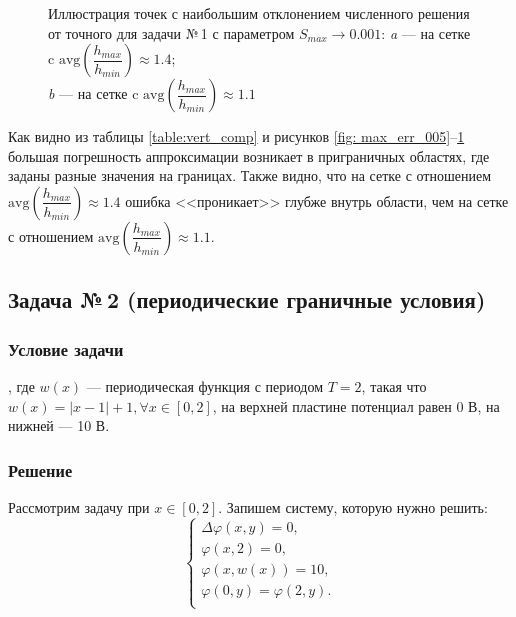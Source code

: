 \documentclass[12pt, a4paper]{article}
\renewcommand{\phi}{\varphi}
\begin{document}
\begin{figure}[!h]
\begin{center}
				\end{center} 
				\vspace*{-0.0mm} 
				\caption{Иллюстрация точек с наибольшим отклонением численного решения от точного для задачи №\,1 с параметром $S_{max} \rightarrow 0.001$: 
				\textit{a} --- на сетке c $\mathrm{avg} \left( \dfrac{h_{max}}{h_{min}} \right) \approx 1.4 $;\\
				\textit{b} --- на сетке c $\mathrm{avg} \left( \dfrac{h_{max}}{h_{min}} \right) \approx 1.1$
				} 
				\label{fig: max_err_0001}
			\end{figure}
			
			
			
			Как видно из таблицы \ref{table:vert_comp} и рисунков \ref{fig: max_err_005}--\ref{fig: max_err_0001} большая погрешность аппроксимации возникает в приграничных областях, где заданы разные значения на границах. Также видно, что на сетке с отношением  $\mathrm{avg} \left( \dfrac{h_{max}}{h_{min}} \right) \approx 1.4 $ ошибка <<проникает>> глубже внутрь области, чем на сетке с отношением $\mathrm{avg} \left( \dfrac{h_{max}}{h_{min}} \right) \approx 1.1 $. 
			
	
	\newpage
	\subsection{Задача №\,2 (периодические граничные условия)}
		\subsubsection{Условие задачи}
			, где $w(x)$ --- периодическая функция с периодом $T = 2$, такая что $w(x) = |x - 1| + 1, \forall x \in \left[ 0, 2 \right]$, на верхней пластине потенциал равен 0 В, на нижней --- 10 В.
		\subsubsection{Решение}
			Рассмотрим задачу при $x \in \left[ 0, 2 \right]$. Запишем систему, которую нужно решить:
			\begin{equation*}
				\begin{cases}
					\Delta \phi (x, y)  = 0, \\
					\phi (x, 2) = 0, \\
					\phi (x, w(x)) = 10, \\
					\phi (0, y) = \phi (2, y).\\
				\end{cases}
			\end{equation*}
			
\end{document}
